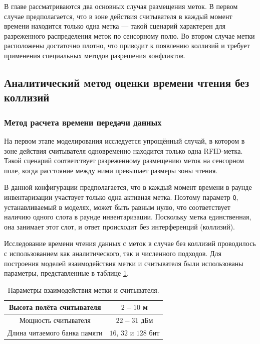 \documentclass[12pt]{article}
\theoremstyle{definition}
\begin{document}
В главе рассматриваются два основных случая размещения меток. В первом случае предполагается, что в зоне действия считывателя в каждый момент времени находится только одна метка — такой сценарий характерен для разреженного распределения меток по сенсорному полю. Во втором случае метки расположены достаточно плотно, что приводит к появлению коллизий и требует применения специальных методов разрешения конфликтов. 

\subsection{Аналитический метод оценки времени чтения без коллизий}
\label{sec:ch33}

\subsubsection{Метод расчета времени передачи данных}

На первом этапе моделирования исследуется упрощённый случай, в котором в зоне действия считывателя одновременно находится только одна RFID-метка. Такой сценарий соответствует разреженному размещению меток на сенсорном поле, когда расстояние между ними превышает размеры зоны чтения.

В данной конфигурации предполагается, что в каждый момент времени в раунде инвентаризации участвует только одна активная метка. Поэтому параметр \texttt{Q}, устанавливаемый в моделях, может быть равным нулю, что соответствует наличию одного слота в раунде инвентаризации. Поскольку метка единственная, она занимает этот слот, и ответ происходит без интерференций (коллизий).

Исследование времени чтения данных с меток в случае без коллизий проводилось с использованием как аналитического, так и численного подходов. Для построения моделей взаимодействия метки и считывателя были использованы параметры, представленные в таблице \ref{table:parameters}.

\begin{table}[]
    \centering
    \begin{tabular}{|c|c|}
        \hline
        Высота полёта считывателя & $2-10$ м \\
        \hline
        Мощность считывателя & $22-31$ дБм \\
        \hline
        Длина читаемого банка памяти & $16$, $32$ и $128$ бит \\
        \hline
    \end{tabular}
    \caption{Параметры взаимодействия метки и считывателя.}
    \label{table:parameters}
\end{table}
\end{document}
